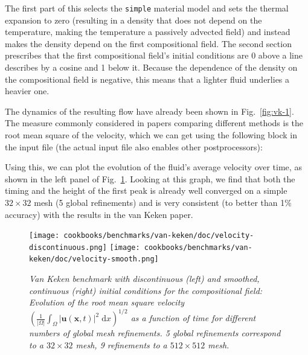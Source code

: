 \documentclass{article}
\begin{document}


The first part of this selects the \texttt{simple} material model and sets the
thermal expansion to zero (resulting in a density that does not depend on the
temperature, making the temperature a passively advected field) and instead
makes the density depend on the first compositional field. The second section
prescribes that the first compositional field's
initial conditions are 0 above a line describes by a cosine and 1 below it.
Because the dependence of the density on the compositional field is negative,
this means that a lighter fluid underlies a heavier one.

The dynamics of the resulting flow have already been shown in
Fig.~\ref{fig:vk-1}. The measure commonly considered in papers comparing
different methods is the root mean square of the velocity, which we can get
using the following block in the input file (the actual input file also enables
other postprocessors):



Using this, we can plot the evolution of the fluid's average velocity over time,
as shown in the left panel of Fig.~\ref{fig:vk-2}. Looking at this graph, we
find that both the timing and the height of the first peak is already
well converged on a simple
$32\times 32$ mesh (5 global refinements) and is very consistent (to better
than 1\% accuracy) with the results in the van Keken paper.

\begin{figure}
  \texttt{[image: cookbooks/benchmarks/van-keken/doc/velocity-discontinuous.png]}
  \hfill
  \texttt{[image: cookbooks/benchmarks/van-keken/doc/velocity-smooth.png]}
  \caption{\it Van Keken benchmark with discontinuous (left) and smoothed,
  continuous (right) initial conditions for the compositional field:
  Evolution of the root mean square velocity $\left(\frac 1{|\Omega|}\int_\Omega |\mathbf u(\mathbf x,t)|^2 \;
  \text{d}x\right)^{1/2}$ as a function of time for different numbers of global mesh
  refinements. 5 global refinements correspond to a $32\times 32$ mesh, 9
  refinements to a $512\times 512$ mesh.}
  \label{fig:vk-2}
\end{figure}
\end{document}
